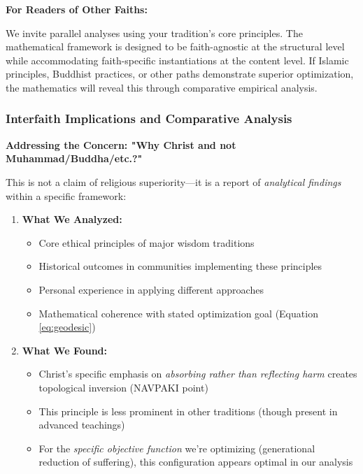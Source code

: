\documentclass[11pt,a4paper]{article}
\theoremstyle{definition}
\theoremstyle{remark}
\begin{document}
\begin{small}
\begin{mdframed}[backgroundcolor=blue!5]
\textbf{For Readers of Other Faiths:}

We invite parallel analyses using your tradition's core principles. The mathematical framework is designed to be faith-agnostic at the structural level while accommodating faith-specific instantiations at the content level. If Islamic principles, Buddhist practices, or other paths demonstrate superior optimization, the mathematics will reveal this through comparative empirical analysis.
\end{mdframed}


\subsubsection{Interfaith Implications and Comparative Analysis}

\textbf{Addressing the Concern: "Why Christ and not Muhammad/Buddha/etc.?"}

This is not a claim of religious superiority—it is a report of \textit{analytical findings} within a specific framework:

\begin{enumerate}
\item \textbf{What We Analyzed:}
\begin{itemize}
\item Core ethical principles of major wisdom traditions
\item Historical outcomes in communities implementing these principles  
\item Personal experience in applying different approaches
\item Mathematical coherence with stated optimization goal (Equation \ref{eq:geodesic})
\end{itemize}

\item \textbf{What We Found:}
\begin{itemize}
\item Christ's specific emphasis on \textit{absorbing rather than reflecting harm} creates topological inversion (NAVPAKI point)
\item This principle is less prominent in other traditions (though present in advanced teachings)
\item For the \textit{specific objective function} we're optimizing (generational reduction of suffering), this configuration appears optimal in our analysis
\end{itemize}


\end{enumerate}
\end{small}
\end{document}
